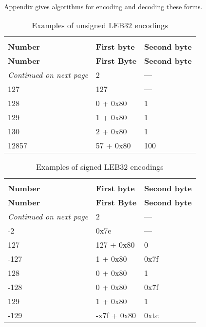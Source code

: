 Appendix  
gives algorithms for encoding and decoding these forms.


\begin{centering}
\setlength{\extrarowheight}{0.1cm}
\begin{longtable}{l|l|l}
  \caption{Examples of unsigned LEB32 encodings} \label{tab:examplesofunsignedleb128encodings} \\
  \hline \\ \bfseries Number&\bfseries First byte &\bfseries Second byte \\ \hline
\endfirsthead
  \bfseries Number&\bfseries First Byte &\bfseries Second byte\\ \hline
\endhead
  \hline \emph{Continued on next page}
\endfoot
  \hline
\endlastfoot
2&2& --- \\
127&127& ---\\
128& 0 + 0x80 & 1 \\
129& 1 + 0x80 & 1 \\
130& 2 + 0x80 & 1 \\
12857& 57 + 0x80 & 100 \\

\end{longtable}
\end{centering}



\begin{centering}
\setlength{\extrarowheight}{0.1cm}
\begin{longtable}{l|l|l}
  \caption{Examples of signed LEB32 encodings} \label{tab:examplesofsignedleb128encodings} \\
  \hline \\ \bfseries Number&\bfseries First byte &\bfseries Second byte \\ \hline
\endfirsthead
  \bfseries Number&\bfseries First Byte &\bfseries Second byte\\ \hline
\endhead
  \hline \emph{Continued on next page}
\endfoot
  \hline
\endlastfoot
2&2& --- \\
-2&0x7e& ---\\
127& 127 + 0x80 & 0 \\
-127& 1 + 0x80 & 0x7f \\
128& 0 + 0x80 & 1 \\
-128& 0 + 0x80 & 0x7f \\
129& 1 + 0x80 & 1 \\
-129& -x7f + 0x80 & 0xtc \\

\end{longtable}
\end{centering}



